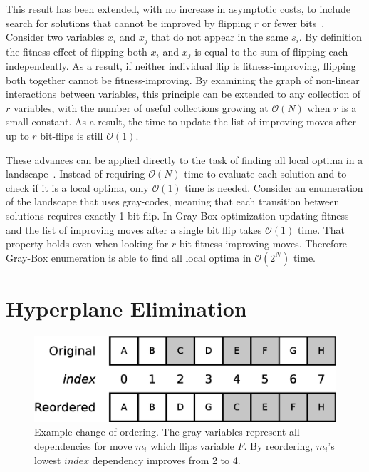 \documentclass[runningheads,a4paper]{llncs}
\newcommand{\includegraphicsfit}[1]
{\texttt{[image: \#1]}}
\newcommand{\BigO}[1]{$\mathcal{O}{(#1)}$}
\begin{document}
This result has been extended, with no increase in asymptotic costs,
to include search for
solutions that cannot be improved by flipping $r$ or fewer bits~\cite{chicano:2014:ball}.
Consider two variables $x_i$ and $x_j$ that do not appear in the same $s_i$.
By definition the fitness effect of flipping both $x_i$ and $x_j$ is equal to the sum
of flipping each independently. As a result, if neither individual flip is fitness-improving,
flipping both together cannot be fitness-improving. By examining the graph of non-linear
interactions between variables, this principle can be extended to any collection of $r$
variables, with the number of useful collections growing at \BigO{N} when $r$ is a small constant.
As a result, the time to update the list of improving moves after up to $r$ bit-flips is still \BigO{1}.

These advances can be applied directly to the task of finding all local optima in a
landscape~\cite{ochoa:2015:crossovernetworks}.
Instead of requiring \BigO{N} time to evaluate each solution and to check if it
is a local optima, only \BigO{1} time is needed. Consider an enumeration of the landscape
that uses gray-codes, meaning that each transition between solutions requires exactly 1 bit flip.
In Gray-Box optimization updating fitness and the list of improving moves after a single bit flip
takes \BigO{1} time. That property holds even when looking for $r$-bit fitness-improving moves.
Therefore Gray-Box enumeration is able to find all local optima in \BigO{2^N} time.

\section{Hyperplane Elimination}
\begin{figure}
  \centering
  \includegraphics[width=.75\columnwidth,height=\textheight,keepaspectratio]{Enumerate}
  \caption{Example change of ordering. The gray variables represent all dependencies
           for move $m_i$ which flips variable $F$. By reordering, $m_i$'s lowest $index$ dependency improves from 2 to 4.}
  \label{fig-enumerate}
\end{figure}
\end{document}
